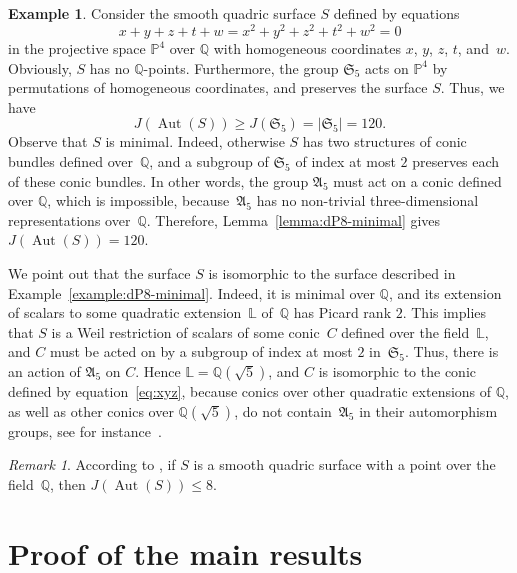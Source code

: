 \documentclass[12pt]{amsart}
\newcounter{cequation}[section]
\theoremstyle{definition}
\newtheorem{example}[cequation]{Example}
\theoremstyle{remark}
\newtheorem{remark}[cequation]{Remark}
\newcommand{\QQ}{\mathbb{Q}}
\newcommand{\PP}{\mathbb{P}}
\newcommand{\LL}{\mathbb{L}}
\newcommand{\SSS}{\mathfrak{S}}
\newcommand{\AAA}{\mathfrak{A}}
\newcommand{\Aut}{\operatorname{Aut}}
\newcommand{\Gal}{\operatorname{Gal}}
\def \ge {\geqslant}
\def \le {\leqslant}
\begin{document}
\begin{example}\label{example:dP8-minimal-alternative}
Consider the smooth quadric surface $S$ defined by equations
$$
x+y+z+t+w=x^2+y^2+z^2+t^2+w^2=0
$$
in the projective space $\PP^4$ over $\QQ$ with homogeneous coordinates
$x$, $y$, $z$, $t$, and~$w$.
Obviously, $S$ has no $\QQ$-points.
Furthermore, the group $\SSS_5$ acts on $\PP^4$ by permutations of homogeneous coordinates, and preserves the
surface $S$. Thus, we have
$$
J(\Aut(S))\ge J(\SSS_5)=|\SSS_5|=120.
$$
Observe that $S$ is minimal. Indeed, otherwise
$S$ has two structures of conic bundles defined over~$\QQ$, and a subgroup of $\SSS_5$ of index at most $2$
preserves each of these conic bundles. In other words, the group $\AAA_5$ must act
on a conic defined over $\QQ$, which is impossible, because~$\AAA_5$ has no non-trivial three-dimensional
representations over~$\QQ$.
Therefore, Lemma~\ref{lemma:dP8-minimal} gives~\mbox{$J(\Aut(S))=120$}.


We point out that the surface $S$ is isomorphic to the surface described
in Example~\ref{example:dP8-minimal}. Indeed,
it is minimal over $\QQ$, and its extension of scalars to
some quadratic extension~$\LL$ of~$\QQ$ has Picard rank $2$. This implies that $S$
is a Weil restriction of scalars
of some conic~$C$ defined over the field~$\LL$, and $C$ must be acted on
by a subgroup of index at most $2$ in~$\SSS_5$. Thus, there is an action of
$\AAA_5$ on $C$. Hence $\LL=\QQ(\sqrt{5})$, and $C$ is isomorphic
to the conic defined by equation~\eqref{eq:xyz}, because conics over other quadratic extensions of $\QQ$,
as well as other conics over $\QQ(\sqrt{5})$,
do not contain~$\AAA_5$ in their automorphism groups,
see for instance~\mbox{\cite[Theorem~1.2(c)]{GA}}.
\end{example}

\begin{remark}
According to \cite[Theorem~1.2(4)]{Zaitsev-quadrics}, if $S$ is a smooth quadric surface
with a point over the field~$\QQ$, then $J(\Aut(S))\le 8$.
\end{remark}


\section{Proof of the main results}
\label{section:results}
\end{document}
